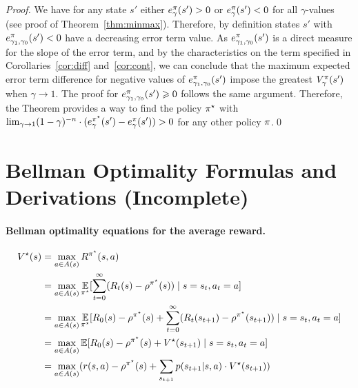 \documentclass[envcountsame]{llncs}
\begin{document}
\begin{proof}
  We have for any state \(s'\) either \(e_{\gamma}^{\pi}(s') > 0\) or \(e_{\gamma}^{\pi}(s') < 0\)
  for all \(\gamma\)-values (see proof of Theorem~\ref{thm:minmax}). Therefore, by definition states
  \(s'\) with \(e_{\gamma_{1},\gamma_{0}}^{\pi}(s') < 0\) have a decreasing error term value. As
  \(e_{\gamma_{1},\gamma_{0}}^{\pi}(s')\) is a direct measure for the slope of the error term, and
  by the characteristics on the term specified in Corollaries~\ref{cor:diff} and~\ref{cor:cont}, we
  can conclude that the maximum expected error term difference for negative values of
  \(e_{\gamma_{1},\gamma_{0}}^{\pi}(s')\) impose the greatest \(V_{\gamma}^{\pi}(s')\) when
  \(\gamma \to 1\). The proof for \(e_{\gamma_{1},\gamma_{0}}^{\pi}(s') \geqslant 0\) follows the
  same argument. Therefore, the Theorem provides a way to find the policy \(\pi^{\star}\) with
  \(\lim_{\gamma \to 1} (1-\gamma)^{-n} \cdot ( e_{\gamma}^{\pi^{\star}}(s') - e_{\gamma}^{\pi}(s')) >
  0\) for any other policy \(\pi\).\qed
\end{proof}


\section{Bellman Optimality Formulas and Derivations (Incomplete)}
\label{sec:bellman_optimality}

\paragraph{Bellman optimality equations for the average reward.}

\begin{align*}
  V^{\star}(s) & = \max_{a \in A(s)} R^{\pi^{\star}}(s,a) \\
               & = \max_{a \in A(s)} \operatorname*{\mathbb{E}}_{\pi^{\star}} [ \sum_{t=0}^{\infty}(R_{t}(s) - \rho^{\pi^{\star}}(s)) \mid s=s_{t}, a_{t} = a] \\
               & = \max_{a \in A(s)} \operatorname*{\mathbb{E}}_{\pi^{\star}} [ R_{0}(s) - \rho^{\pi^{\star}}(s) + \sum_{t=0}^{\infty}(R_{t}(s_{t+1}) - \rho^{\pi^{\star}}(s_{t+1}))  \mid s=s_{t}, a_{t} = a] \\
               & = \max_{a \in A(s)} \operatorname*{\mathbb{E}} [ R_{0}(s) - \rho^{\pi^{\star}}(s) + V^{\star}(s_{t+1})  \mid s=s_{t}, a_{t} = a ] \\
               & = \max_{a \in A(s)} (r(s,a) - \rho^{\pi^{\star}}(s) + \sum_{s_{t+1}} p(s_{t+1}|s,a) \cdot V^{\star}(s_{t+1}))
\end{align*}
\end{document}
